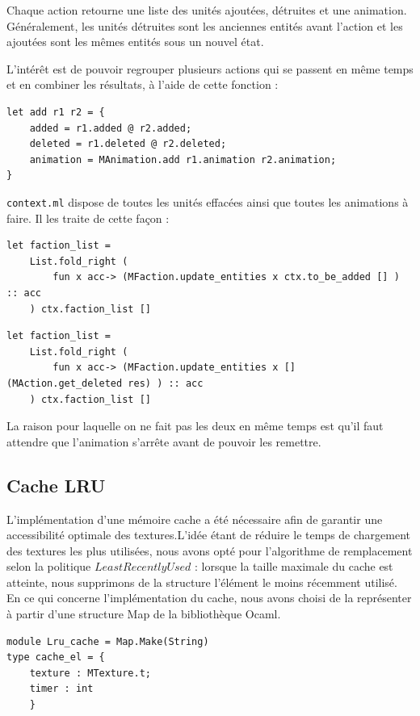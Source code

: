 \documentclass{article}
\begin{document}
Chaque action retourne une liste des unités ajoutées, détruites et une animation. Généralement, les unités détruites
sont les anciennes entités avant l'action et les ajoutées sont les mêmes entités sous un nouvel état. 

L'intérêt est de pouvoir regrouper plusieurs actions qui se passent en même temps et
en combiner les résultats, à l'aide de cette fonction :

\begin{verbatim}
let add r1 r2 = {
    added = r1.added @ r2.added;
    deleted = r1.deleted @ r2.deleted;
    animation = MAnimation.add r1.animation r2.animation;
} 
\end{verbatim}

\texttt{context.ml} dispose de toutes les unités effacées ainsi que toutes les animations à faire. Il les traite de cette façon : 

\begin{verbatim}
let faction_list =
    List.fold_right (
        fun x acc-> (MFaction.update_entities x ctx.to_be_added [] ) :: acc
    ) ctx.faction_list []
\end{verbatim}

\begin{verbatim}
let faction_list =
    List.fold_right (
        fun x acc-> (MFaction.update_entities x [] (MAction.get_deleted res) ) :: acc
    ) ctx.faction_list []
\end{verbatim}

La raison pour laquelle on ne fait pas les deux en même temps est qu'il faut attendre que l'animation s'arrête avant de pouvoir les remettre.

\subsection{Cache LRU}

L'implémentation d'une mémoire cache a été nécessaire afin de garantir une accessibilité optimale des textures.L'idée étant de réduire le temps de chargement des textures
les plus utilisées, nous avons opté pour l'algorithme de remplacement
selon la politique $Least Recently Used$ : lorsque la taille maximale du cache est atteinte,
nous supprimons de la structure l'élément le moins récemment utilisé.
En ce qui concerne l'implémentation du cache, nous avons choisi de la représenter à partir d'une structure Map de la bibliothèque Ocaml.

\begin{verbatim}
module Lru_cache = Map.Make(String)
type cache_el = {
    texture : MTexture.t;
    timer : int 
    }
\end{verbatim}
\end{document}
